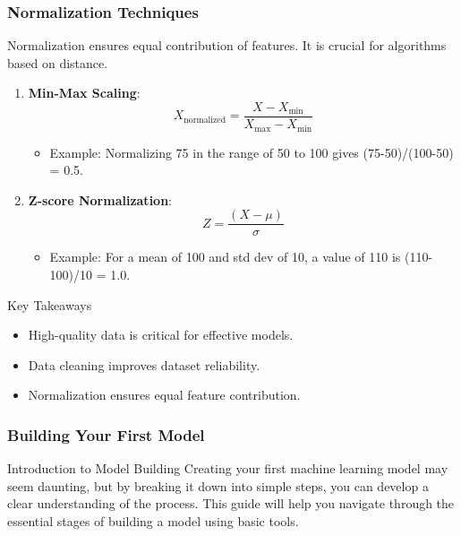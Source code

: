 \documentclass[aspectratio=169]{beamer}
\begin{document}
\begin{frame}[fragile]
    \frametitle{Normalization Techniques}

    Normalization ensures equal contribution of features. It is crucial for algorithms based on distance.

    \begin{enumerate}
        \item \textbf{Min-Max Scaling}:
            \[
            X_{\text{normalized}} = \frac{X - X_{\text{min}}}{X_{\text{max}} - X_{\text{min}}}
            \]
            \begin{itemize}
                \item Example: Normalizing 75 in the range of 50 to 100 gives (75-50)/(100-50) = 0.5.
            \end{itemize}

        \item \textbf{Z-score Normalization}:
            \[
            Z = \frac{(X - \mu)}{\sigma}
            \]
            \begin{itemize}
                \item Example: For a mean of 100 and std dev of 10, a value of 110 is (110-100)/10 = 1.0.
            \end{itemize}
    \end{enumerate}

    \begin{block}{Key Takeaways}
        \begin{itemize}
            \item High-quality data is critical for effective models.
            \item Data cleaning improves dataset reliability.
            \item Normalization ensures equal feature contribution.
        \end{itemize}
    \end{block}
\end{frame}

\begin{frame}
    \frametitle{Building Your First Model}
    \begin{block}{Introduction to Model Building}
        Creating your first machine learning model may seem daunting, but by breaking it down into simple steps, you can develop a clear understanding of the process. This guide will help you navigate through the essential stages of building a model using basic tools.
    \end{block}
\end{frame}
\end{document}
